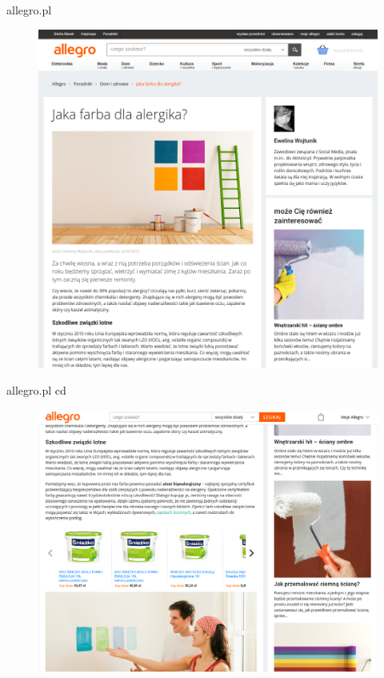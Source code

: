 \documentclass{beamer}
\begin{document}
	\begin{frame}{allegro.pl}
		\begin{figure}
			\centering
			\includegraphics[width=1\textwidth]{img/screen_allegro.png}
		\end{figure}
	\end{frame}
	
	\begin{frame}{allegro.pl cd}
		\begin{figure}
			\centering
			\includegraphics[width=1\textwidth]{img/screen_allegro_2.png}
		\end{figure}
	\end{frame}
	
\end{document}
